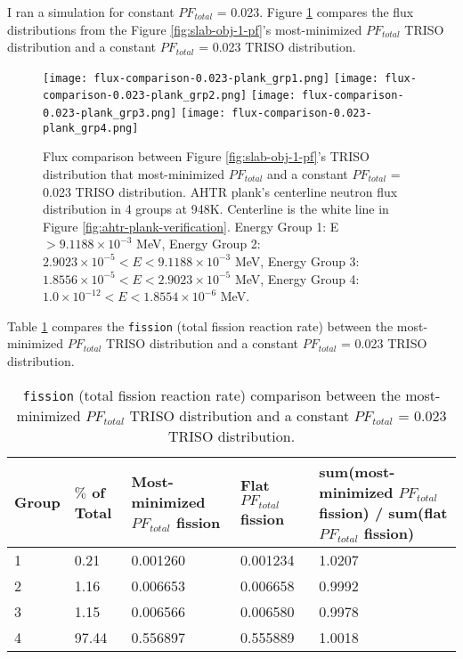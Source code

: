 I ran a simulation for constant $PF_{total}$ = 0.023. 
Figure \ref{fig:flux-comparison-0.023-plank} compares the flux distributions from the 
Figure \ref{fig:slab-obj-1-pf}'s most-minimized $PF_{total}$ TRISO distribution and a 
constant $PF_{total}$ = 0.023 TRISO distribution. 
\begin{figure}[H]
    \centering
    \texttt{[image: flux-comparison-0.023-plank\_grp1.png]} 
    \texttt{[image: flux-comparison-0.023-plank\_grp2.png]} 
    \texttt{[image: flux-comparison-0.023-plank\_grp3.png]} 
    \texttt{[image: flux-comparison-0.023-plank\_grp4.png]} 
    \caption{Flux comparison between Figure \ref{fig:slab-obj-1-pf}'s TRISO 
    distribution that most-minimized $PF_{total}$ and a constant $PF_{total}$ = 0.023
    TRISO distribution. 
    \acrfull{AHTR} plank's centerline neutron flux distribution in 4 groups at 948K. 
    Centerline is the white line in Figure \ref{fig:ahtr-plank-verification}.
    Energy Group 1: E $> 9.1188 \times 10^{-3}$ MeV, 
    Energy Group 2: $2.9023 \times 10^{-5} < E < 9.1188 \times 10^{-3}$ MeV,
    Energy Group 3:  $1.8556 \times 10^{-5} < E < 2.9023 \times 10^{-5}$ MeV,
    Energy Group 4:  $1.0 \times 10^{-12} < E < 1.8554 \times 10^{-6}$ MeV.}
    \label{fig:flux-comparison-0.023-plank}
\end{figure}

Table \ref{tab:0.023-plank-fission-rate} compares the \texttt{fission} 
(total fission reaction rate) between the most-minimized $PF_{total}$ TRISO 
distribution and a constant $PF_{total}$ = 0.023 TRISO distribution.
\begin{table}[H]
    \centering
    \onehalfspacing
    \caption{\texttt{fission} (total fission reaction rate) comparison 
    between the most-minimized $PF_{total}$ TRISO distribution and a constant 
    $PF_{total}$ = 0.023 TRISO distribution.}
	\label{tab:0.023-plank-fission-rate}
    \footnotesize
    \begin{tabular}{llp{4cm}p{4cm}p{5cm}}
    \hline
    \textbf{Group} & 
    \textbf{$\%$ of Total} &
    \textbf{Most-minimized $PF_{total}$ fission} & 
    \textbf{Flat $PF_{total}$ fission} & 
    \textbf{sum(most-minimized $PF_{total}$ fission) / sum(flat $PF_{total}$ fission)}\\
    \hline 
    1 & 0.21 & 0.001260 & 0.001234 & 1.0207 \\
    2 & 1.16 & 0.006653 & 0.006658 & 0.9992 \\
    3 & 1.15 & 0.006566 & 0.006580 & 0.9978 \\
    4 & 97.44 & 0.556897 & 0.555889 & 1.0018 \\
    \hline
    \end{tabular}
\end{table}

